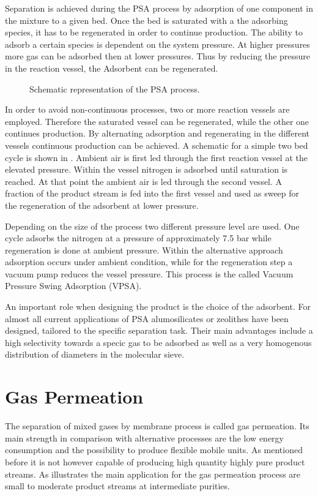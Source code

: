 Separation is achieved during the PSA process by adsorption of one component in the mixture to a given
bed. Once the bed is saturated with a the adsorbing species, it has to be regenerated in order to continue 
production. The ability to adsorb a certain species is dependent on the system pressure. At higher pressures
more gas can be adsorbed then at lower pressures. Thus by reducing the pressure in the reaction vessel, 
the Adsorbent can be regenerated. 

\begin{figure}
	\center
	
	\caption{Schematic representation of the PSA process.}
	\label{fig:PSA}
\end{figure}

In order to avoid non-continuous processes, two or more reaction vessels are employed. Therefore the 
saturated vessel can be regenerated, while the other one continues production. By alternating adsorption 
and regenerating in the different vessels continuous production can be achieved. A schematic for a simple 
two bed cycle is shown in . Ambient air is first led through the first reaction vessel at the 
elevated pressure. Within the vessel nitrogen is adsorbed until saturation is reached. At that point the 
ambient air is led through the second vessel. A fraction of the product stream is fed into the first vessel and 
used as sweep for the regeneration of the adsorbent at lower pressure. 

Depending on the size of the process two different pressure level are used. One cycle adsorbs the nitrogen 
at a pressure of approximately  7.5 bar while regeneration is done at ambient pressure. Within the 
alternative approach adsorption occurs under ambient condition, while for the regeneration step a vacuum 
pump reduces the vessel pressure. This process is the called Vacuum Pressure Swing Adsorption (VPSA). 

An important role when designing the product is the choice of the adsorbent. For almost all current 
applications of PSA alumosilicates or zeolithes have been designed, tailored to the specific separation 
task. Their main advantages include a high selectivity towards a specic gas to be adsorbed as well as a 
very homogenous distribution of diameters in the molecular sieve. 

\section{Gas Permeation}
\label{sec:membrane}
The separation of mixed gases by membrane process is called gas permeation. Its main strength 
in comparison with alternative processes are the low energy consumption and the possibility to 
produce flexible mobile units. As mentioned before it is not however capable of producing high
quantity highly pure product streams. As  illustrates the main application 
for the gas permeation process are small to moderate product streams at intermediate purities.   

